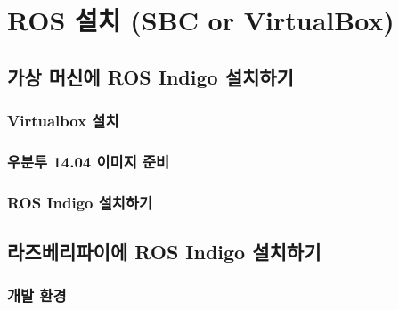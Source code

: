 
\chapter{ROS 설치 (SBC or VirtualBox)}\label{cha:ros_install_sbc}

\section{가상 머신에 ROS Indigo 설치하기}

\subsection{Virtualbox 설치}

\subsection{우분투 14.04 이미지 준비}

\subsection{ROS Indigo 설치하기}

\section{라즈베리파이에 ROS Indigo 설치하기}

\subsection{개발 환경}

